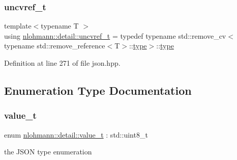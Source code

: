 \subsubsection{\texorpdfstring{uncvref\+\_\+t}{uncvref\_t}}
{\footnotesize\ttfamily template$<$typename T $>$ \\
using \hyperlink{namespacenlohmann_1_1detail_a53a082eedad9f4729fcd8fed552a21f7}{nlohmann\+::detail\+::uncvref\+\_\+t} = typedef typename std\+::remove\+\_\+cv$<$typename std\+::remove\+\_\+reference$<$T$>$\+::\hyperlink{classstd_1_1conditional_1_1type}{type}$>$\+::\hyperlink{classstd_1_1conditional_1_1type}{type}}



Definition at line 271 of file json.\+hpp.



\subsection{Enumeration Type Documentation}
\mbox{\label{namespacenlohmann_1_1detail_a1ed8fc6239da25abcaf681d30ace4985}} 
\subsubsection{\texorpdfstring{value\+\_\+t}{value\_t}}
{\footnotesize\ttfamily enum \hyperlink{namespacenlohmann_1_1detail_a1ed8fc6239da25abcaf681d30ace4985}{nlohmann\+::detail\+::value\+\_\+t} \+: std\+::uint8\+\_\+t\hspace{0.3cm}{\ttfamily [strong]}}



the J\+S\+ON type enumeration 

